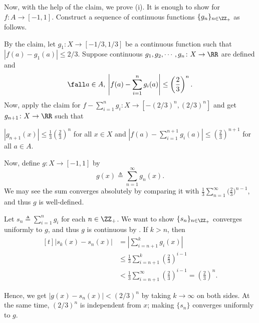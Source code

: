 \documentclass[MAS331_Note.tex]{subfiles}
\begin{document}
{    Now, with the help of the claim, we prove (i). It is enough to show for
    $f \colon A \to [-1, 1]$. Construct a sequence of continuous functions
    $\{g_n\}_{n \in \ZZ_+}$ as follows.
    \begin{itemize}[nolistsep]
        \ii By the claim, let $g_1 \colon X \to [-1/3, 1/3]$ be a continuous
            function such that $|f(a) - g_1(a)| \le 2/3$.
        \ii Suppose continuous $g_1, g_2, \cdots, g_n \colon X \to \RR$ are defined and
            \[
                \fall a \in A,\: \left|f(a) - \sum_{i=1}^{n} g_i(a)\right|
                \le \left(\frac{2}{3}\right)^n\text{.}
            \]
            Now, apply the claim for $f - \sum_{i=1}^{n} g_i \colon X \to
            [-(2/3)^n, (2/3)^n]$ and get $g_{n+1} \colon X \to \RR$
            such that
            \begin{itemize}[nolistsep]
                \ii $\displaystyle |g_{n+1}(x)|
                \le \frac{1}{3} \left(\frac{2}{3}\right)^n$
                    for all $x \in X$ and
                    \ii $\displaystyle \left|f(a) - \sum_{i=1}^{n+1} g_i(a)\right|
                    \le \left(\frac{2}{3}\right)^{n+1}$ for all $a \in A$.
            \end{itemize}
    \end{itemize}
    
    Now, define $g \colon X \to [-1, 1]$ by
    \[
        g(x) \triangleq \sum_{n=1}^{\infty} g_n(x)\text{.}
    \]
    We may see the sum converges absolutely by comparing it with
    $\frac{1}{3} \sum_{n=1}^{\infty} \big(\frac{2}{3}\big)^{n-1}$, and thus
    $g$ is well-defined.

    Let $s_n \triangleq \sum_{i=1}^{n} g_i$ for each $n \in \ZZ_+$. We want
    to show $\{s_n\}_{n \in \ZZ_+}$ converges uniformly to $g$, and thus
    $g$ is continuous by .
    If $k > n$, then
    \[
        \begin{aligned}[t]
            |s_k(x) - s_n(x)| &= \left|\sum_{i=n+1}^{k} g_i(x)\right| \\
                              &\le \frac{1}{3} \sum_{i=n+1}^{k} \left(\frac{2}{3}\right)^{i-1} \\
                              &< \frac{1}{3} \sum_{i=n+1}^{\infty} \left(\frac{2}{3}\right)^{i-1}
                              = \left(\frac{2}{3}\right)^n\text{.}
        \end{aligned}
    \]

    Hence, we get $|g(x) - s_n(x)| < (2/3)^n$ by taking $k \to \infty$ on both
    sides. At the same time, $(2/3)^n$ is independent from $x$; making $\{s_n\}$
    converges uniformly to $g$.

}
\end{document}
